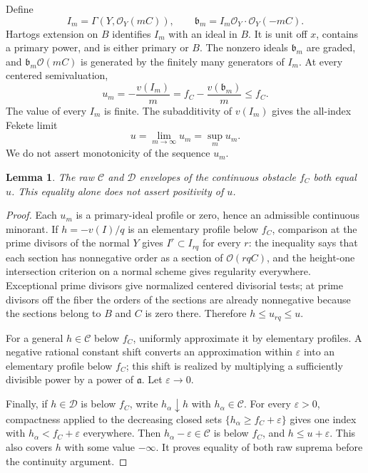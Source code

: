 \documentclass[11pt]{article}
\newtheorem{lemma}[theorem]{Lemma}
\newcommand{\OO}{\mathcal O}
\newcommand{\CC}{\mathcal C}
\newcommand{\DD}{\mathcal D}
\begin{document}
Define
\[
 I_m=\Gamma(Y,\OO_Y(mC)),\qquad
 \mathfrak b_m=I_m\OO_Y\cdot\OO_Y(-mC).
\]
Hartogs extension on $B$ identifies $I_m$ with an ideal in $B$.
It is unit off $x$, contains a primary power, and is either primary or $B$.
The nonzero ideals $\mathfrak b_m$ are graded, and
$\mathfrak b_m\OO(mC)$ is generated by the finitely many generators of
$I_m$. At every centered semivaluation,
\[
 u_m=-\frac{v(I_m)}m
     =f_C-\frac{v(\mathfrak b_m)}m\leq f_C.
\]
The value of every $I_m$ is finite. The subadditivity of $v(I_m)$ gives
the all-index Fekete limit
\[
 u=\lim_{m\to\infty}u_m=\sup_m u_m.
\]
We do not assert monotonicity of the sequence $u_m$.

\begin{lemma}\label{lem:raw}
The raw $\CC$ and $\DD$ envelopes of the continuous obstacle $f_C$
both equal $u$. This equality alone does not assert positivity of $u$.
\end{lemma}
\begin{proof}
Each $u_m$ is a primary-ideal profile or zero, hence an admissible continuous
minorant. If $h=-v(I)/q$ is an elementary profile below $f_C$, comparison at
the prime divisors of the normal $Y$ gives
$I^r\subset I_{rq}$ for every $r$: the inequality says that each section
has nonnegative order as a section of $\OO(rqC)$, and the height-one
intersection criterion on a normal scheme gives regularity everywhere.
Exceptional prime divisors give normalized centered divisorial tests;
at prime divisors off the fiber the orders of the sections are already
nonnegative because the sections belong to $B$ and $C$ is zero there.
Therefore $h\leq u_{rq}\leq u$.

For a general $h\in\CC$ below $f_C$, uniformly approximate it by elementary
profiles. A negative rational constant shift converts an approximation
within $\varepsilon$ into an elementary profile below $f_C$; this shift is
realized by multiplying a sufficiently divisible power by a power of
$\mathfrak a$. Let $\varepsilon\to0$.

Finally, if $h\in\DD$ is below $f_C$, write $h_\alpha\downarrow h$ with
$h_\alpha\in\CC$. For every $\varepsilon>0$, compactness applied to the
decreasing closed sets
$\{h_\alpha\geq f_C+\varepsilon\}$ gives one index with
$h_\alpha<f_C+\varepsilon$ everywhere. Then
$h_\alpha-\varepsilon\in\CC$ is below $f_C$, and $h\leq u+\varepsilon$.
This also covers $h$ with some value $-\infty$. It proves equality of both
raw suprema before the continuity argument.
\end{proof}
\end{document}
